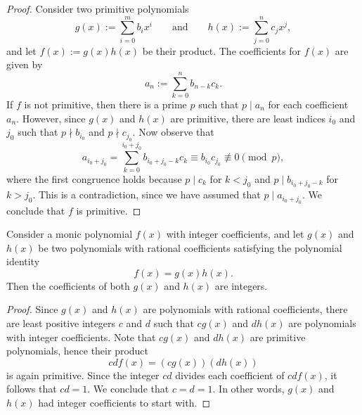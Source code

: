 \begin{proof}
  Consider two primitive polynomials
  \begin{equation*}
    g(x):=\sum_{i=0}^m b_i x^i\qquad\text{and}\qquad h(x):=\sum_{j=0}^n c_jx^j,
  \end{equation*}
  and let $f(x):= g(x)h(x)$ be their product. The coefficients for $f(x)$ are given by
  \begin{equation*}
    a_n := \sum_{k=0}^n b_{n-k}c_k.
  \end{equation*}
  If $f$ is not primitive, then there is a prime $p$ such that $p\mid a_n$ for each coefficient $a_n$. However, since $g(x)$ and $h(x)$ are primitive, there are least indices $i_0$ and $j_0$ such that $p\nmid b_{i_0}$ and $p\nmid c_{j_0}$. Now observe that
  \begin{equation*}
    a_{i_0+j_0}= \sum_{k=0}^{i_0+j_0} b_{i_0+j_0-k}c_k \equiv b_{i_0}c_{j_0}\nequiv 0 \pmod p,
  \end{equation*}
  where the first congruence holds because $p\mid c_k$ for $k<j_0$ and $p\mid b_{i_0+j_0-k}$ for $k>j_0$.
  This is a contradiction, since we have assumed that $p\mid a_{i_0+j_0}$. We conclude that $f$ is primitive.
\end{proof}

\begin{theorem}\label{theorem:gausss-lemma-polynomials}
  Consider a monic polynomial $f(x)$ with integer coefficients, and let $g(x)$ and $h(x)$ be two polynomials with rational coefficients satisfying the polynomial identity
  \begin{equation*}
    f(x)=g(x)h(x).
  \end{equation*}
  Then the coefficients of both $g(x)$ and $h(x)$ are integers.
\end{theorem}

\begin{proof}
  Since $g(x)$ and $h(x)$ are polynomials with rational coefficients, there are least positive integers $c$ and $d$ such that $cg(x)$ and $dh(x)$ are polynomials with integer coefficients. Note that $cg(x)$ and $dh(x)$ are primitive polynomials, hence their product
  \begin{equation*}
    cdf(x)=(cg(x))(dh(x))
  \end{equation*}
  is again primitive. Since the integer $cd$ divides each coefficient of $cdf(x)$, it follows that $cd=1$. We conclude that $c=d=1$. In other words, $g(x)$ and $h(x)$ had integer coefficients to start with.
\end{proof}

